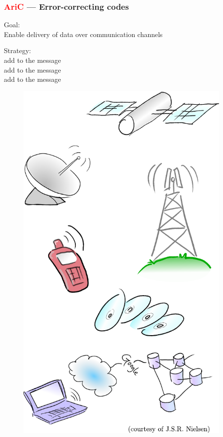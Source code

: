 \documentclass[c]{beamer}
\begin{document}
\begin{frame}
	\frametitle{\textcolor{red}{AriC} --- Error-correcting codes}

\begin{minipage}{0.53\textwidth}
	\begin{small}
	Goal:\\
	Enable  delivery of data over 
	 communication channels

	\bigskip
	Strategy:\\
	add  to the message\\
	add  to the message\\
	add  to the message
	\end{small}
	\end{minipage}
	\begin{minipage}{0.45\textwidth}
	\begin{figure}
		\centering
		\includegraphics[width=0.95\textwidth]{figures/codes_applications.pdf}
	\end{figure}
	\end{minipage}
\end{frame}
\end{document}
